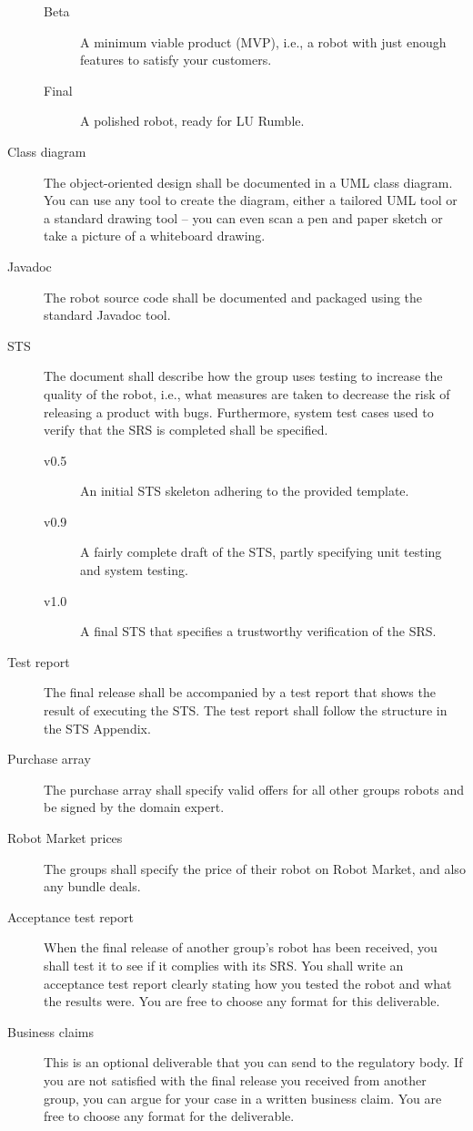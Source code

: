 \documentclass{scrreprt}
\begin{document}
\begin{description}
\begin{description}
\item[Beta] A minimum viable product (MVP), i.e., a robot with just enough features to satisfy your customers.
\item[Final] A polished robot, ready for LU Rumble.
\end{description}
\item[Class diagram] The object-oriented design shall be documented in a UML class diagram. You can use any tool to create the diagram, either a tailored UML tool or a standard drawing tool -- you can even scan a pen and paper sketch or take a picture of a whiteboard drawing.
\item[Javadoc] The robot source code shall be documented and packaged using the standard Javadoc tool.
\item[STS] The document shall describe how the group uses testing to increase the quality of the robot, i.e., what measures are taken to decrease the risk of releasing a product with bugs. Furthermore, system test cases used to verify that the SRS is completed shall be specified.
\begin{description}
\item[v0.5] An initial STS skeleton adhering to the provided template.
\item[v0.9] A fairly complete draft of the STS, partly specifying unit testing and system testing.
\item[v1.0] A final STS that specifies a trustworthy verification of the SRS.
\end{description}
\item[Test report] The final release shall be accompanied by a test report that shows the result of executing the STS. The test report shall follow the structure in the STS Appendix.
\item[Purchase array] The purchase array shall specify valid offers for all other groups robots and be signed by the domain expert.
\item[Robot Market prices] The groups shall specify the price of their robot on Robot Market, and also any bundle deals.
\item[Acceptance test report] When the final release of another group's robot has been received, you shall test it to see if it complies with its SRS. You shall write an acceptance test report clearly stating how you tested the robot and what the results were. You are free to choose any format for this deliverable.
\item[Business claims] This is an optional deliverable that you can send to the regulatory body. If you are not satisfied with the final release you received from another group, you can argue for your case in a written business claim. You are free to choose any format for the deliverable. 
\end{description}
\end{document}
